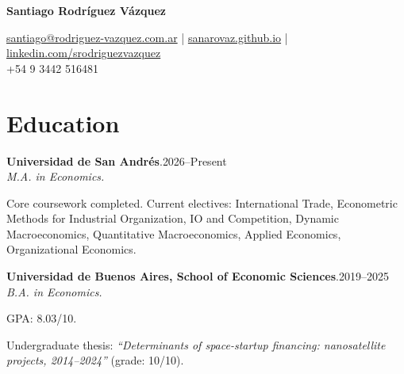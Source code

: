 \documentclass[11pt]{article}
\newcommand{\cvname}{Santiago Rodríguez Vázquez}
\newcommand{\entrydate}[1]{\hfill{\small{#1}}}
\begin{document}
\thispagestyle{firstpage}

{\LARGE\bfseries {\cvname}}

\href{mailto:santiago@rodriguez-vazquez.com.ar}{santiago@rodriguez-vazquez.com.ar} | \href{https://sanarovaz.github.io}{sanarovaz.github.io} | \href{https://linkedin.com/srodriguezvazquez}{linkedin.com/srodriguezvazquez}
\\
+54 9 3442 516481


\section{Education}
\textbf{Universidad de San Andrés}.\entrydate{2026--Present}\\
\textit{M.A. in Economics.}
\begin{cvitems}
  \item Core coursework completed. Current electives: International Trade,
  Econometric Methods for Industrial Organization,
  IO and Competition,
  Dynamic Macroeconomics,
  Quantitative Macroeconomics,
  Applied Economics,
  Organizational Economics.
\end{cvitems}

\smallskip
\textbf{Universidad de Buenos Aires, School of Economic Sciences}.\entrydate{2019--2025}\\
\textit{B.A. in Economics.}
\begin{cvitems}
  \item GPA: 8.03/10.
  \item Undergraduate thesis: \emph{``Determinants of space-startup financing:
        nanosatellite projects, 2014--2024''} (grade: 10/10).
\end{cvitems}

\end{document}

